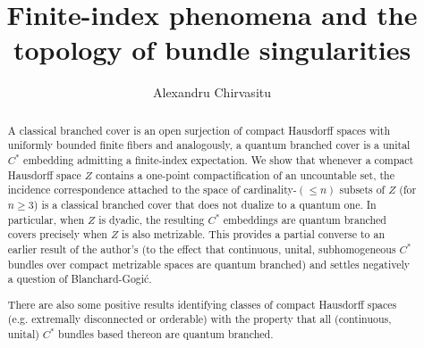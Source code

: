 \documentclass[11pt,leqno]{article}
\title{Finite-index phenomena and the topology of bundle singularities}
\author{Alexandru Chirvasitu}
\theoremstyle{plain}
\theoremstyle{plain}
\theoremstyle{plain}
\numberwithin{equation}{section}
\theoremstyle{nonumberplain}
\newcommand\1{{\bf 1}}
\begin{document}
\date{}


\newcommand{\Addresses}{{%
    \bigskip
    \footnotesize

    \textsc{Department of Mathematics, University at Buffalo}
    \par\nopagebreak
    \textsc{Buffalo, NY 14260-2900, USA}  
    \par\nopagebreak
    \textit{E-mail address}: \texttt{achirvas@buffalo.edu}


  }}


\maketitle

\begin{abstract}
  A classical branched cover is an open surjection of compact Hausdorff spaces with uniformly bounded finite fibers and analogously, a quantum branched cover is a unital $C^*$ embedding admitting a finite-index expectation. We show that whenever a compact Hausdorff space $Z$ contains a one-point compactification of an uncountable set, the incidence correspondence attached to the space of cardinality-$(\le n)$ subsets of $Z$ (for $n\ge 3$) is a classical branched cover that does not dualize to a quantum one. In particular, when $Z$ is dyadic, the resulting $C^*$ embeddings are quantum branched covers precisely when $Z$ is also metrizable. This provides a partial converse to an earlier result of the author's (to the effect that continuous, unital, subhomogeneous $C^*$ bundles over compact metrizable spaces are quantum branched) and settles negatively a question of Blanchard-Gogi\'{c}.

  There are also some positive results identifying classes of compact Hausdorff spaces (e.g. extremally disconnected or orderable) with the property that all (continuous, unital) $C^*$ bundles based thereon are quantum branched. 
\end{abstract}

\end{document}
